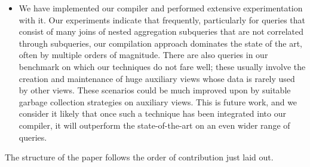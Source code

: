 \begin{itemize}
\item
We have implemented our compiler and performed extensive experimentation with it. Our experiments
indicate that frequently, particularly for queries that consist of many joins of nested aggregation
subqueries that are not correlated through subqueries, our compilation approach dominates the
state of the art, often by multiple orders of magnitude. There are also queries in our benchmark
on which our techniques do not fare well; these usually involve the creation and maintenance of huge
auxiliary views whose data is rarely used by other views. These scenarios could be much improved upon
by suitable garbage collection strategies on auxiliary views. This is future work, and we consider
it likely that once such a technique has been integrated into our compiler, it will outperform the
state-of-the-art on an even wider range of queries.
\end{itemize}


The structure of the paper follows the order of contribution just laid out.















